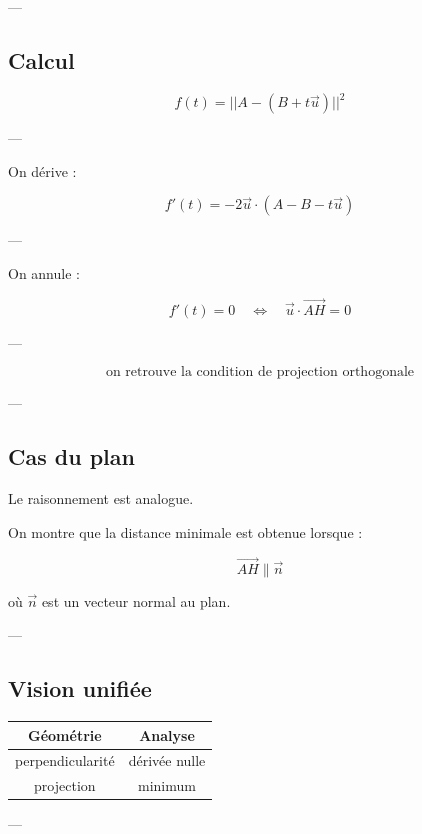 \documentclass[11pt,a4paper]{article}
\begin{document}
---

\subsection{Calcul}

\[
f(t) = ||A - (B + t\vec{u})||^2
\]

---

On dérive :

\[
f'(t) = -2 \vec{u} \cdot (A - B - t\vec{u})
\]

---

On annule :

\[
f'(t) = 0 \quad \Longleftrightarrow \quad \vec{u} \cdot \vec{AH} = 0
\]

---

\[
\boxed{
\text{on retrouve la condition de projection orthogonale}
}
\]

---

\subsection{Cas du plan}

Le raisonnement est analogue.

\bigskip

On montre que la distance minimale est obtenue lorsque :

\[
\vec{AH} \parallel \vec{n}
\]

où $\vec{n}$ est un vecteur normal au plan.

---

\subsection{Vision unifiée}

\begin{center}
\begin{tabular}{|c|c|}
\hline
Géométrie & Analyse \\
\hline
perpendicularité & dérivée nulle \\
\hline
projection & minimum \\
\hline
\end{tabular}
\end{center}

---

\end{document}
